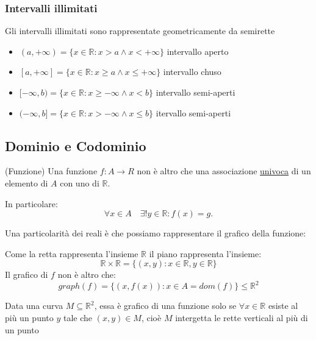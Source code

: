 \documentclass[../main.tex, class=article, 12pt]{subfiles}
\begin{document}
\subsubsection{Intervalli illimitati}
Gli intervalli illimitati sono rappresentate geometricamente da semirette

\begin{itemize}
        \item $ (a,+\infty) = \{x \in \mathbb{R} : x>a \wedge x<+\infty\} $ intervallo aperto
        \item $ [a,+\infty] = \{x \in \mathbb{R} : x\ge a \wedge x\le +\infty\} $ intervallo chuso
        \item $ [-\infty,b) = \{x \in \mathbb{R} : x\ge -\infty \wedge x<b\} $ intervallo semi-aperti
        \item $ (-\infty,b] = \{x \in \mathbb{R} : x>-\infty \wedge x\le b\} $ itervallo semi-aperti
\end{itemize}


\subsection{Dominio e Codominio}\label{sec:}

\begin{definition}
        (Funzione) Una funzione $ f:A \to R $ non è altro che una associazione \underline{univoca} di un elemento di $ A $ con uno di $ \mathbb{R} $. \par
        In particolare:
\begin{equation*}
        \forall x \in A \quad \exists! y\in\mathbb{R} : f(x) = g.
\end{equation*}
\end{definition}


\begin{tcolorbox}
\begin{prop}
       Una particolarità dei reali è che possiamo rappresentare il grafico della funzione:
\end{prop}
\end{tcolorbox}
Come la retta rappresenta l'insieme $ \mathbb{R} $ il piano rappresenta l'insieme:
\begin{equation*}
        \mathbb{R}\times\mathbb{R} = \{(x,y): x\in \mathbb{R}, y \in \mathbb{R}\}
\end{equation*}
Il grafico di $ f $ non è altro che:
\begin{equation*}
        graph(f) = \{(x, f(x)) : x \in A = dom(f)\}\le \mathbb{R}^2
\end{equation*}

\begin{tcolorbox}
\begin{oss}
        Data una curva $ M \subseteq \mathbb{R}^2 $, essa è grafico di una funzione solo se $ \forall x \in \mathbb{R}$ esiste al più un punto $ y $ tale che $ (x,y) \in M $, cioè $ M $ intergetta le rette verticali al più di un punto
\end{oss}
\end{tcolorbox}
\end{document}
